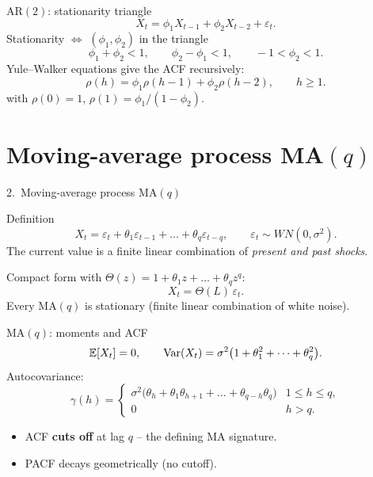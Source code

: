 \documentclass[aspectratio=169]{beamer}
\begin{document}
\begin{frame}{AR$(2)$: stationarity triangle}
  \[
    X_t = \phi_1 X_{t-1} + \phi_2 X_{t-2} + \varepsilon_t.
  \]
  Stationarity $\Leftrightarrow$ $(\phi_1, \phi_2)$ in the triangle
  \[
    \phi_1 + \phi_2 < 1, \qquad
    \phi_2 - \phi_1 < 1, \qquad
    -1 < \phi_2 < 1.
  \]
  \pause
  Yule--Walker equations give the ACF recursively:
  \[
    \rho(h) = \phi_1 \rho(h-1) + \phi_2 \rho(h-2),
    \qquad h \geq 1.
  \]
  with $\rho(0) = 1$,
  $\rho(1) = \phi_1 / (1 - \phi_2)$.
\end{frame}

\section{Moving-average process MA$(q)$}

\begin{frame}{2.~Moving-average process MA$(q)$}
  \begin{block}{Definition}
    \[
      X_t = \varepsilon_t + \theta_1 \varepsilon_{t-1}
            + \dots + \theta_q \varepsilon_{t-q},
      \qquad \varepsilon_t \sim WN(0, \sigma^2).
    \]
    The current value is a finite linear combination of \emph{present
    and past shocks}.
  \end{block}
  \pause
  Compact form with $\Theta(z) = 1 + \theta_1 z + \dots + \theta_q z^q$:
  \[
    X_t = \Theta(L)\, \varepsilon_t.
  \]
  \alert{Every MA$(q)$ is stationary} (finite linear combination of
  white noise).
\end{frame}

\begin{frame}{MA$(q)$: moments and ACF}
  \[
    \mathbb{E}[X_t] = 0,
    \qquad
    \mathrm{Var}(X_t) = \sigma^2 \bigl(1 + \theta_1^2 + \dots + \theta_q^2\bigr).
  \]
  Autocovariance:
  \[
    \gamma(h) =
    \begin{cases}
      \sigma^2 \bigl(\theta_h + \theta_1 \theta_{h+1} + \dots
                     + \theta_{q-h}\theta_q\bigr) & 1 \leq h \leq q, \\[2pt]
      0                                          & h > q.
    \end{cases}
  \]
  \pause
  \begin{itemize}
    \item ACF \textbf{cuts off} at lag $q$ -- the defining MA
          signature.
    \item PACF decays geometrically (no cutoff).
  \end{itemize}
\end{frame}
\end{document}
